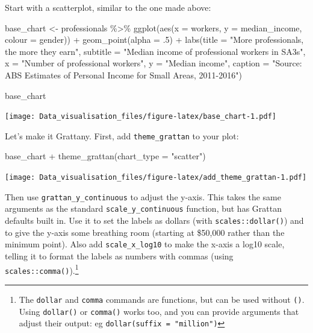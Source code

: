 \documentclass[
]{book}
\newenvironment{Shaded}{\begin{snugshade}}{\end{snugshade}}
\newcommand{\AttributeTok}[1]{\textcolor[rgb]{0.77,0.63,0.00}{#1}}
\newcommand{\DecValTok}[1]{\textcolor[rgb]{0.00,0.00,0.81}{#1}}
\newcommand{\FunctionTok}[1]{\textcolor[rgb]{0.00,0.00,0.00}{#1}}
\newcommand{\NormalTok}[1]{#1}
\newcommand{\OtherTok}[1]{\textcolor[rgb]{0.56,0.35,0.01}{#1}}
\newcommand{\SpecialCharTok}[1]{\textcolor[rgb]{0.00,0.00,0.00}{#1}}
\newcommand{\StringTok}[1]{\textcolor[rgb]{0.31,0.60,0.02}{#1}}
\begin{document}
Start with a scatterplot, similar to the one made above:

\begin{Shaded}
\begin{Highlighting}[]
\NormalTok{base\_chart }\OtherTok{\textless{}{-}}\NormalTok{ professionals }\SpecialCharTok{\%\textgreater{}\%} 
        \FunctionTok{ggplot}\NormalTok{(}\FunctionTok{aes}\NormalTok{(}\AttributeTok{x =}\NormalTok{ workers,}
                   \AttributeTok{y =}\NormalTok{ median\_income,}
                   \AttributeTok{colour =}\NormalTok{ gender)) }\SpecialCharTok{+} 
        \FunctionTok{geom\_point}\NormalTok{(}\AttributeTok{alpha =}\NormalTok{ .}\DecValTok{5}\NormalTok{) }\SpecialCharTok{+} 
        \FunctionTok{labs}\NormalTok{(}\AttributeTok{title =} \StringTok{"More professionals, the more they earn"}\NormalTok{,}
             \AttributeTok{subtitle =} \StringTok{"Median income of professional workers in SA3s"}\NormalTok{,}
             \AttributeTok{x =} \StringTok{"Number of professional workers"}\NormalTok{,}
             \AttributeTok{y =} \StringTok{"Median income"}\NormalTok{,}
             \AttributeTok{caption =} \StringTok{"Source: ABS Estimates of Personal Income for Small Areas, 2011{-}2016"}\NormalTok{)}

\NormalTok{base\_chart}
\end{Highlighting}
\end{Shaded}

\texttt{[image: Data\_visualisation\_files/figure-latex/base\_chart-1.pdf]}

Let's make it Grattany. First, add \texttt{theme\_grattan} to your plot:

\begin{Shaded}
\begin{Highlighting}[]
\NormalTok{base\_chart }\SpecialCharTok{+}
        \FunctionTok{theme\_grattan}\NormalTok{(}\AttributeTok{chart\_type =} \StringTok{"scatter"}\NormalTok{)}
\end{Highlighting}
\end{Shaded}

\texttt{[image: Data\_visualisation\_files/figure-latex/add\_theme\_grattan-1.pdf]}

Then use \texttt{grattan\_y\_continuous} to adjust the y-axis. This takes the same arguments as the standard \texttt{scale\_y\_continuous} function, but has Grattan defaults built in. Use it to set the labels as dollars (with \texttt{scales::dollar()}) and to give the y-axis some breathing room (starting at \$50,000 rather than the minimum point).
Also add \texttt{scale\_x\_log10} to make the x-axis a log10 scale, telling it to format the labels as numbers with commas (using \texttt{scales::comma()}).\footnote{The \texttt{dollar} and \texttt{comma} commands are functions, but can be used without \texttt{()}. Using \texttt{dollar()} or \texttt{comma()} works too, and you can provide arguments that adjust their output: eg \texttt{dollar(suffix\ =\ "million")}}
\end{document}
